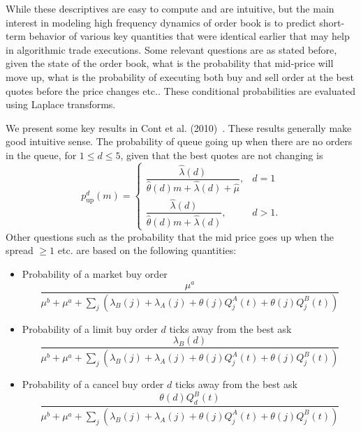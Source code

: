While these descriptives are easy to compute and are intuitive, but the main interest in modeling high frequency dynamics of order book is to predict short-term behavior of various key quantities that were identical earlier that may help in algorithmic trade executions. Some relevant questions are as stated before, given the state of the order book, what is the probability that mid-price will move up, what is the probability of executing both buy and sell order at the best quotes before the price changes etc.. These conditional probabilities are evaluated using Laplace transforms.


We present some key results in Cont et al. (2010)~\cite{contstoi}. These results generally make good intuitive sense. The probability of queue going up when there are no orders in the queue, for $1 \leq d \leq 5$, given that the best quotes are not changing is
	\begin{equation}\label{eqn:queuecon}
	p_{\text{up}}^d(m)=
	\begin{cases}
	\dfrac{\hat{\lambda}(d)}{\hat{\theta}(d)m+\hat{\lambda}(d)+\hat{\mu}}, & d=1 \\
	\dfrac{\hat{\lambda}(d)}{\hat{\theta}(d)m+\hat{\lambda}(d)}, & d>1.
	\end{cases}
	\end{equation}
Other questions such as the probability that the mid price goes up when the spread $\geq 1$ etc. are based on the following quantities:
\begin{itemize}
\item Probability of a market buy order
	\begin{equation}\label{eqn:probmarketbuy}
	\dfrac{\mu^a}{\mu^b+\mu^a+\sum_j (\lambda_B(j)+\lambda_A(j)+\theta(j) Q_j^A(t)+\theta(j)Q_j^B(t))}
	\end{equation}
\item Probability of a limit buy order $d$ ticks away from the best ask
	\begin{equation}\label{eqn:problimitbuytick}
	\dfrac{\lambda_B(d)}{\mu^b+\mu^a+\sum_j(\lambda_B(j)+\lambda_A(j)+\theta(j)Q_j^A(t)+\theta(j)Q_j^B(t))}
	\end{equation}
\item Probability of a cancel buy order $d$ ticks away from the best ask
	\begin{equation}\label{eqn:probcanceltick}
	\dfrac{\theta(d)Q_d^B(t)}{\mu^b+\mu^a+\sum_j(\lambda_B(j)+\lambda_A(j)+\theta(j)Q_j^A(t)+\theta(j)Q_j^B(t))}
	\end{equation}
\end{itemize}
